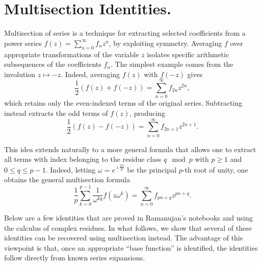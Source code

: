 \documentclass[11pt,oneside,reqno]{article}
\theoremstyle{definition}
\begin{document}
\section{Multisection Identities.}
Multisection of series is a technique for extracting selected coefficients from a power series $f(z) = \sum_{n=0}^{\infty} f_n z^n$,
by exploiting symmetry. Averaging $f$ over appropriate transformations of the variable $z$ isolates specific arithmetic subsequences of the coefficients $f_n$. The simplest example comes from the involution $z\mapsto-z$. Indeed, averaging $f(z)$ with $f(-z)$ gives
\begin{equation}
\frac{1}{2}\left(f(z) + f(-z)\right) = \sum_{n=0}^{\infty} f_{2n} z^{2n},
\end{equation}
which retains only the even-indexed terms of the original series. Subtracting instead extracts the odd terms of $f(z)$, producing
\begin{equation}
\frac{1}{2}\left(f(z) - f(-z)\right) = \sum_{n=0}^{\infty} f_{2n+1} z^{2n+1}.
\end{equation}

This idea extends naturally to a more general formula that allows one to extract all terms with index belonging to the residue class $q \mod p$ with $p\ge1$ and $0\le q\le p-1$. Indeed, letting $\omega = e^{\imath \frac{2 \pi }{p}}$ be the principal $p$-th root of unity, one obtains the general multisection formula \cite[Ch. 4]{Riordan}
\begin{equation}
\label{general multisection}
\frac{1}{p}\sum_{k=0}^{p-1} \frac{1}{\omega^{kq}} f\left(z\omega^k\right) = \sum_{n=0}^{\infty} f_{pn+q} z^{pn+q}.
\end{equation}

Below are a few identities that are proved in Ramanujan's notebooks \cite{R2} and \cite{R4} using the calculus of 
complex
residues. In what follows, we show that several of these identities can be recovered using multisection instead. The advantage of this viewpoint is that, once an appropriate ``base function'' is identified, the identities follow directly from known series expansions.
\end{document}
